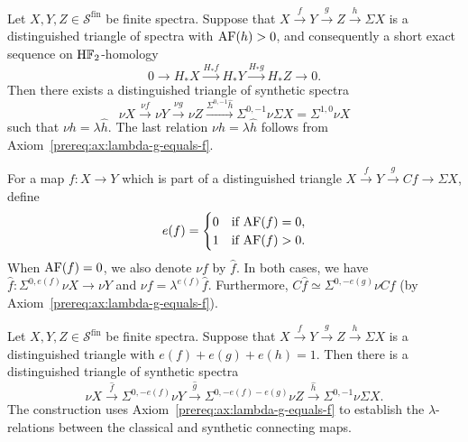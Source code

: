 \begin{proposition}\label{prereq:prop:syn-distinguished-triangle}
    \leanok
    Let $X, Y, Z \in \mathcal{S}^{\mathrm{fin}}$ be finite spectra. Suppose that $X \xrightarrow{f} Y \xrightarrow{g} Z \xrightarrow{h} \Sigma X$ is a distinguished triangle of spectra with $\mathrm{AF}(h) > 0$, and consequently a short exact sequence on $\mathrm{H}{\mathbb F}_2$-homology
    $$0 \to H_*X \xrightarrow{H_*f} H_*Y \xrightarrow{H_*g} H_*Z \to 0.$$
    Then there exists a distinguished triangle of synthetic spectra
    $$\nu X \xrightarrow{\nu f} \nu Y \xrightarrow{\nu g} \nu Z \xrightarrow{\Sigma^{0,-1}\hat{h}} \Sigma^{0,-1}\nu \Sigma X = \Sigma^{1,0}\nu X$$
    such that $\nu h = \lambda \hat{h}$. The last relation $\nu h = \lambda \hat{h}$ follows from Axiom~\ref{prereq:ax:lambda-g-equals-f}.
\end{proposition}

\begin{notation}\label{prereq:not:fhat}
    \leanok
    For a map $f: X \to Y$ which is part of a distinguished triangle $X \xrightarrow{f} Y \xrightarrow{g} Cf \to \Sigma X$, define
    $$e(f) = \begin{cases}
        0 & \text{if } \mathrm{AF}(f) = 0, \\
        1 & \text{if } \mathrm{AF}(f) > 0.
    \end{cases}$$
    When $\mathrm{AF}(f) = 0$, we also denote $\nu f$ by $\hat{f}$. In both cases, we have $\hat{f}: \Sigma^{0,e(f)}\nu X \to \nu Y$ and $\nu f = \lambda^{e(f)}\hat{f}$. Furthermore, $C\hat{f} \simeq \Sigma^{0,-e(g)}\nu Cf$ (by Axiom~\ref{prereq:ax:lambda-g-equals-f}).
\end{notation}

\begin{proposition}\label{prereq:prop:fhat-triangle}
    \leanok
    Let $X, Y, Z \in \mathcal{S}^{\mathrm{fin}}$ be finite spectra. Suppose that $X \xrightarrow{f} Y \xrightarrow{g} Z \xrightarrow{h} \Sigma X$ is a distinguished triangle with $e(f) + e(g) + e(h) = 1$. Then there is a distinguished triangle of synthetic spectra
    $$\nu X \xrightarrow{\hat{f}} \Sigma^{0,-e(f)}\nu Y \xrightarrow{\hat{g}} \Sigma^{0,-e(f)-e(g)}\nu Z \xrightarrow{\hat{h}} \Sigma^{0,-1}\nu \Sigma X.$$
    The construction uses Axiom~\ref{prereq:ax:lambda-g-equals-f} to establish the $\lambda$-relations between the classical and synthetic connecting maps.
\end{proposition}
